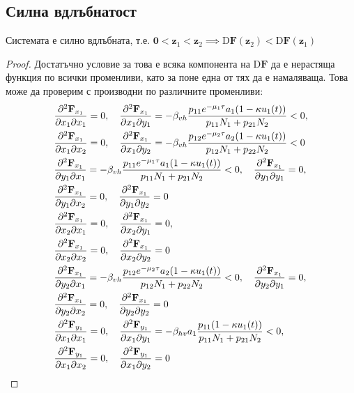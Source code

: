 \subsection{Силна вдлъбнатост}
\begin{proposition}
  Системата е силно вдлъбната, т.е. $\mathbf{0} < \mathbf{z}_1 < \mathbf{z}_2 \implies \mathrm{D}\mathbf{F}(\mathbf{z}_2) < \mathrm{D}\mathbf{F}(\mathbf{z}_1)$
\end{proposition}
\begin{proof}

  Достатъчно условие за това е всяка компонента на $\mathrm{D}\mathbf{F}$ да е нерастяща функция по всички променливи, като за поне една от тях да е намаляваща. Това може да проверим с производни по различните променливи:
{\allowdisplaybreaks
  \begin{align*}
    &\pdv{\mathbf{F}_{x_1}}{x_1}{x_1} = 0, \quad
    \pdv{\mathbf{F}_{x_1}}{x_1}{y_1} = -\beta_{vh} \frac{p_{11} e^{-\mu_1 \tau} a_1 (1-\kappa u_1(t))}{p_{11} N_1 + p_{21} N_2} < 0, \\
    &\pdv{\mathbf{F}_{x_1}}{x_1}{x_2} = 0, \quad
    \pdv{\mathbf{F}_{x_1}}{x_1}{y_2} = -\beta_{vh} \frac{p_{12} e^{-\mu_2 \tau} a_2 (1-\kappa u_1(t))}{p_{12} N_1 + p_{22} N_2} < 0 \\
    &\pdv{\mathbf{F}_{x_1}}{y_1}{x_1} = -\beta_{vh} \frac{p_{11} e^{-\mu_1 \tau} a_1 (1-\kappa u_1(t))}{p_{11} N_1 + p_{21} N_2}  < 0, \quad
    \pdv{\mathbf{F}_{x_1}}{y_1}{y_1} = 0, \\
    &\pdv{\mathbf{F}_{x_1}}{y_1}{x_2} = 0, \quad
    \pdv{\mathbf{F}_{x_1}}{y_1}{y_2} = 0 \\
    &\pdv{\mathbf{F}_{x_1}}{x_2}{x_1} = 0, \quad
    \pdv{\mathbf{F}_{x_1}}{x_2}{y_1} = 0, \\
    &\pdv{\mathbf{F}_{x_1}}{x_2}{x_2} = 0, \quad
    \pdv{\mathbf{F}_{x_1}}{x_2}{y_2} = 0 \\
    &\pdv{\mathbf{F}_{x_1}}{y_2}{x_1} = -\beta_{vh} \frac{p_{12} e^{-\mu_2 \tau} a_2 (1-\kappa u_1(t))}{p_{12} N_1 + p_{22} N_2} < 0, \quad
    \pdv{\mathbf{F}_{x_1}}{y_2}{y_1} = 0, \\
    &\pdv{\mathbf{F}_{x_1}}{y_2}{x_2} = 0, \quad
    \pdv{\mathbf{F}_{x_1}}{y_2}{y_2} = 0 \\
    &\pdv{\mathbf{F}_{y_1}}{x_1}{x_1} = 0, \quad
    \pdv{\mathbf{F}_{y_1}}{x_1}{y_1} = -\beta_{hv} a_1 \frac{p_{11} (1-\kappa u_1(t))}{p_{11} N_1 + p_{21} N_2} < 0, \\
    &\pdv{\mathbf{F}_{y_1}}{x_1}{x_2} = 0, \quad
    \pdv{\mathbf{F}_{y_1}}{x_1}{y_2} = 0 \\

\end{align*}}
\end{proof}
